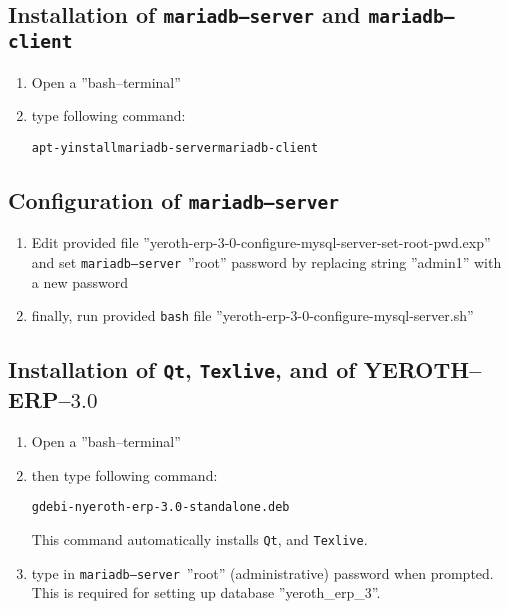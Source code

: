 \documentclass[a4paper, 10pt]{article}
\newcommand{\texlive}{\texttt{Texlive}\xspace}
\newcommand{\bash}{\texttt{bash}\xspace}
\newcommand{\qt}{\texttt{Qt}\xspace}
\newcommand{\mariadbserver}{\texttt{mariadb--server}\xspace}
\newcommand{\mariadbclient}{\texttt{mariadb--client}\xspace}
\newcommand{\yerotherptroiszero}{\textcolor{yerothColorBlue}{\sc YEROTH--ERP--$3.0$}\xspace}
\newcommand{\rootcommand}[1]{
\begin{center}
\textcolor{purplish}{#1\xspace}
\end{center}}
\begin{document}
\subsection{Installation of \mariadbserver and \mariadbclient}

\begin{enumerate}[1)]
	\item Open a ''bash--terminal''
	\item type following command:
		\begin{alltt}
			\rootcommand{apt -y install mariadb-server mariadb-client}
		\end{alltt}		
\end{enumerate} 

\subsection{Configuration of \mariadbserver}

\begin{enumerate}[1)]
	\item Edit provided file ''yeroth-erp-3-0-configure-mysql-server-set-root-pwd.exp''
		and set \mariadbserver\ ''root'' password by replacing string 
		''admin1'' with a new password
	\item finally, run provided \bash file
		''yeroth-erp-3-0-configure-mysql-server.sh''	
\end{enumerate}

\subsection{Installation of \qt, \texlive, and of \yerotherptroiszero}

\begin{enumerate}[1)]
	\item Open a ''bash--terminal''

	\item then type following command:
		\begin{alltt}
			\rootcommand{gdebi -n yeroth-erp-3.0-standalone.deb}
		\end{alltt}

	This command automatically installs \qt, and \texlive.
		
	\item type in \mariadbserver\ ''root'' (administrative)
		password when prompted. This is required
		for setting up  database ''yeroth\_erp\_3''.
\end{enumerate}
\end{document}
